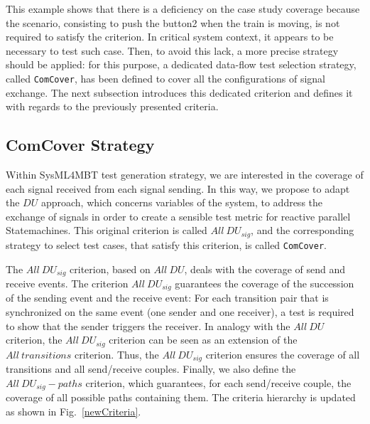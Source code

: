 \documentclass{llncs}
\begin{document}
This example shows that there is a deficiency on the case study coverage
because the scenario, consisting to push the button2 when the train is
moving, is not required to satisfy the criterion. In critical system
context, it appears to be necessary to test such case. Then, to avoid
this lack, a more precise strategy should be applied: for this
purpose, a dedicated data-flow test selection strategy, called
\texttt{ComCover}, has been defined to cover all the configurations of signal
exchange. The next subsection introduces this dedicated criterion and
defines it with regards to the previously presented criteria.
\vspace*{-.4cm}

\subsection{ComCover Strategy}

Within SysML4MBT test generation strategy, we are interested in the
coverage of each signal received from each signal sending. In this way,
we propose to adapt the $DU$ approach, which concerns variables of the
system, to address the exchange of signals in order to create a
sensible test metric for reactive parallel Statemachines. This
original criterion is called $All~DU_{sig}$, and the corresponding
strategy to select test cases, that satisfy this criterion, is called
\texttt{ComCover}. 

The $All~DU_{sig}$ criterion, based on $All~DU$, deals with the coverage of
send and receive events. The criterion $All~DU_{sig}$ guarantees the coverage of the
succession of the sending event and the receive event: For each
transition pair that is synchronized on the same event (one sender and
one receiver), a test is required to show that the sender triggers the
receiver. In analogy with the
$All~DU$ criterion, the $All~DU_{sig}$ criterion can be seen as an extension
of the $All~transitions$ criterion. Thus, the $All~DU_{sig}$ criterion
ensures the coverage of all transitions and all send/receive
couples. Finally, we also define the 
$All~DU_{sig}-paths$ criterion, which guarantees, for each
send/receive couple, the coverage of all possible paths containing
them. The criteria hierarchy is updated as shown in
Fig.~\ref{newCriteria}. 
\end{document}
